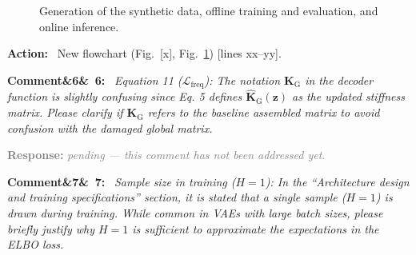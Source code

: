 \documentclass[11pt]{article}
\newenvironment{rcomment}[1]{\par\bigskip\noindent\textbf{Comment\ifx&#1&\else\ #1\fi:}\ \itshape}{\par}
\newenvironment{action}{\par\smallskip\noindent\color{resp}\textbf{Action:}\ }{\par}
\newcommand{\pending}{\par\smallskip\noindent\textcolor{gray}{\textbf{Response:} \textit{pending --- this comment
has not been addressed yet.}}\par}
\newcommand{\tbd}[1]{\textcolor{note}{\textsf{[#1]}}}
\newcommand{\lines}[1]{\tbd{lines #1}}
\newcommand{\m}{\mathbf{m}}
\newcommand{\z}{\mathbf{z}}
\begin{document}
\begin{figure}[H]
\caption{Generation of the synthetic data, offline training and evaluation, and online inference.}
\label{fig:flowchart}
\end{figure}

\begin{action}
New flowchart (Fig.~\tbd{x}, Fig.~\ref{fig:flowchart}) \lines{xx--yy}.
\end{action}

\begin{rcomment}{6}
Equation 11 ($\mathcal{L}_{\mathrm{freq}}$): The notation $\mathbf{K}_{\mathrm{G}}$ in the decoder function is slightly
confusing since Eq. 5 defines $\hat{\mathbf{K}}_{\mathrm{G}}(\z)$ as the updated stiffness matrix. Please clarify if
$\mathbf{K}_{\mathrm{G}}$ refers to the baseline assembled matrix to avoid confusion with the damaged global matrix.
\end{rcomment}
\pending

\begin{rcomment}{7}
Sample size in training ($H=1$): In the ``Architecture design and training specifications'' section, it is stated that
a single sample ($H=1$) is drawn during training. While common in VAEs with large batch sizes, please briefly justify why
$H=1$ is sufficient to approximate the expectations in the ELBO loss.
\end{rcomment}
\end{document}
